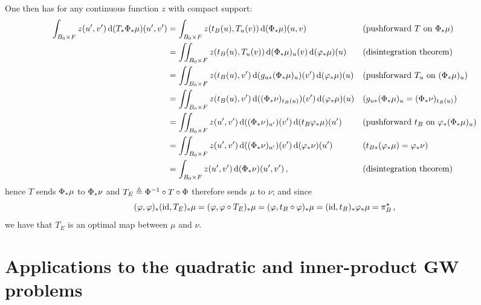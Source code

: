 One then has for any continuous function $z$ with compact support:
\begin{align*}
    \int_{ B_0 \times F } z(u',v')\, \mathrm d(T_*\Phi_*\mu)(u',v') & =\int_{ B_0 \times F }z(t_ B (u),T_u(v))\, \mathrm d(\Phi_*\mu)(u,v) &  & \text{(pushforward } T \text{ on }\Phi_*\mu \text{)} \\
        & =\iint_{ B_0 \times F }z(t_ B (u),T_u(v))\, \mathrm d(\Phi_*\mu)_{u}(v)\, \mathrm d(\varphi_*\mu)(u) &  & \text{(disintegration theorem)} \\
        & =\iint_{ B_0 \times F }z(t_ B (u),v')\, \mathrm d(g_{u*}(\Phi_*\mu)_{u})(v')\, \mathrm d(\varphi_*\mu)(u) &  & \text{(pushforward } T_u \text{ on }(\Phi_*\mu)_{u} \text{)} \\
        & =\iint_{ B_0 \times F }z(t_ B (u),v')\, \mathrm d((\Phi_*\nu)_{t_ B (u)})(v')\, \mathrm d(\varphi_*\mu)(u) &  & (g_{u*}(\Phi_*\mu)_{u}=(\Phi_*\nu)_{t_ B (u)}) \\
        & =\iint_{ B_0 \times F }z(u',v')\, \mathrm d((\Phi_*\nu)_{u'})(v')\, \mathrm d(t_ B \varphi_*\mu)(u') &  & \text{(pushforward } t_ B  \text{ on }\varphi_*(\Phi_*\mu)_{u} \text{)} \\
        & =\iint_{ B_0 \times F }z(u',v')\, \mathrm d((\Phi_*\nu)_{u'})(v')\, \mathrm d(\varphi_*\nu)(u') &  & (t_{ B *}(\varphi_*\mu)=\varphi_*\nu) \\
        & =\int_{ B_0 \times F }z(u',v')\, \mathrm d(\Phi_*\nu)(u',v')\,, &  & \text{(disintegration theorem)}
    \end{align*}
hence $T$ sends $\Phi_*\mu$ to $\Phi_*\nu$ and $T_E\triangleq\Phi^{-1}\circ T\circ\Phi$ therefore sends $\mu$ to $\nu$; and since
\[ (\varphi,\varphi)_*(\operatorname{id},T_E)_*\mu=(\varphi,\varphi\circ T_E)_*\mu=(\varphi,t_{ B }\circ \varphi)_*\mu=(\operatorname{id},t_{ B })_*\varphi_*\mu=\pi_{ B }^\star \,,\]
we have that $T_E$ is an optimal map between $\mu$ and $\nu$.

    \section{Applications to the quadratic and inner-product GW problems}
    \label{subsec:applications}

